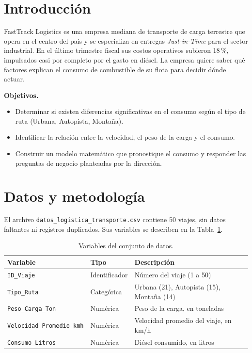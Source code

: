 \documentclass[12pt,letterpaper]{article}
\begin{document}
\section{Introducción}

FastTrack Logistics es una empresa mediana de transporte de carga terrestre que opera en el centro del país y se especializa en entregas \emph{Just-in-Time} para el sector industrial. En el último trimestre fiscal sus costos operativos subieron 18\,\%, impulsados casi por completo por el gasto en diésel. La empresa quiere saber qué factores explican el consumo de combustible de su flota para decidir dónde actuar.

\textbf{Objetivos.}
\begin{itemize}[itemsep=0pt]
  \item Determinar si existen diferencias significativas en el consumo según el tipo de ruta (Urbana, Autopista, Montaña).
  \item Identificar la relación entre la velocidad, el peso de la carga y el consumo.
  \item Construir un modelo matemático que pronostique el consumo y responder las preguntas de negocio planteadas por la dirección.
\end{itemize}

\section{Datos y metodología}

El archivo \texttt{datos\_logistica\_transporte.csv} contiene 50 viajes, sin datos faltantes ni registros duplicados. Sus variables se describen en la Tabla~\ref{tab:variables}.

\begin{table}[H]
\centering
\caption{Variables del conjunto de datos.}
\label{tab:variables}
\begin{tabular}{lll}
\toprule
Variable & Tipo & Descripción \\
\midrule
\texttt{ID\_Viaje} & Identificador & Número del viaje (1 a 50) \\
\texttt{Tipo\_Ruta} & Categórica & Urbana (21), Autopista (15), Montaña (14) \\
\texttt{Peso\_Carga\_Ton} & Numérica & Peso de la carga, en toneladas \\
\texttt{Velocidad\_Promedio\_kmh} & Numérica & Velocidad promedio del viaje, en km/h \\
\texttt{Consumo\_Litros} & Numérica & Diésel consumido, en litros \\
\bottomrule
\end{tabular}
\end{table}
\end{document}
